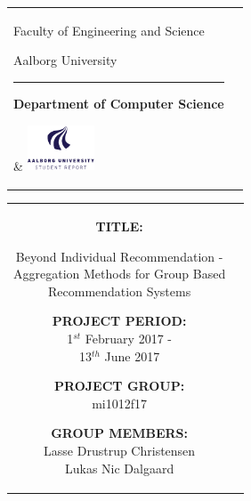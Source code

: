 \begin{titlepage}
\thispagestyle{empty}

\begin{nopagebreak}
{\samepage

\begin{tabular}{lr}
        \parbox{14.5cm}{
          {\LARGE Faculty of Engineering and Science}

          {\small Aalborg University}
          \vspace{-0.3cm}\\
        \hrule
        \vspace{0.2cm}
          {\bf Department of Computer Science}
         }   & \hspace{-2.0cm} \includegraphics[width=2cm]{graphics/aau_logo_en}
\end{tabular}

\begin{tabular}{cc}
\parbox{7cm}{
\hspace{2cm}
\begin{description}

\item {\bf TITLE:}

\noindent Beyond Individual Recommendation - \\
Aggregation Methods for Group Based \\Recommendation Systems


\end{description}

\parbox{8cm}{

\begin{description}
        \item {\bf PROJECT PERIOD:}\\
          1$^{st}$ February 2017 -\\ 13$^{th}$ June 2017\\
          \hspace{4cm}
        \item {\bf PROJECT GROUP:}\\
          mi1012f17\\
          \hspace{4cm}
        \item {\bf GROUP MEMBERS:}\\
          Lasse Drustrup Christensen \\
          Lukas Nic Dalgaard 
          \hspace{2cm}
          

\end{description}}}
\end{tabular}}
\end{nopagebreak}
\end{titlepage}
